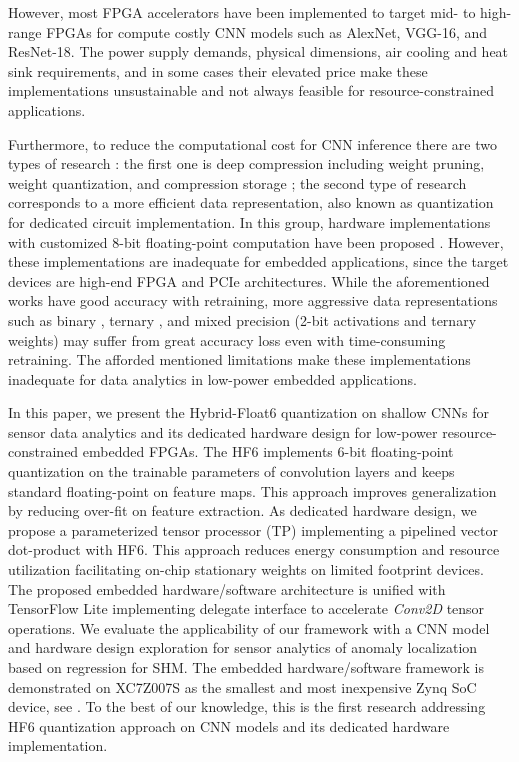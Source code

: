 However, most FPGA accelerators have been implemented to target mid- to high-range FPGAs for compute costly CNN models such as AlexNet, VGG-16, and ResNet-18. The power supply demands, physical dimensions, air cooling and heat sink requirements, and in some cases their elevated price make these implementations unsustainable and not always feasible for resource-constrained applications.

Furthermore, to reduce the computational cost for CNN inference there are two types of research \cite{wu2021low}: the first one is deep compression including weight pruning, weight quantization, and compression storage \cite{han2015deep,han2015learning}; the second type of research corresponds to a more efficient data representation, also known as quantization for dedicated circuit implementation. In this group, hardware implementations with customized 8-bit floating-point computation have been proposed \cite{mei2017200mhz, wu2021low, lian2019high}. However, these implementations are inadequate for embedded applications, since the target devices are high-end FPGA and PCIe architectures. While the aforementioned works have good accuracy with retraining, more aggressive data representations such as binary \cite{courbariaux2015binaryconnect}, ternary \cite{lin2015neural}, and mixed precision (2-bit activations and ternary weights) \cite{colangelo2018exploration} may suffer from great accuracy loss even with time-consuming retraining. The afforded mentioned limitations make these implementations inadequate for data analytics in low-power embedded applications.

In this paper, we present the Hybrid-Float6 quantization on shallow CNNs for sensor data analytics and its dedicated hardware design for low-power resource-constrained embedded FPGAs. The HF6 implements 6-bit floating-point quantization on the trainable parameters of convolution layers and keeps standard floating-point on feature maps. This approach improves generalization by reducing over-fit on feature extraction. As dedicated hardware design, we propose a parameterized tensor processor (TP) implementing a pipelined vector dot-product with HF6. This approach reduces energy consumption and resource utilization facilitating on-chip stationary weights on limited footprint devices. The proposed embedded hardware/software architecture is unified with TensorFlow Lite implementing delegate interface to accelerate \emph{Conv2D} tensor operations. We evaluate the applicability of our framework with a CNN model and hardware design exploration for sensor analytics of anomaly localization based on regression for SHM. The embedded hardware/software framework is demonstrated on XC7Z007S as the smallest and most inexpensive Zynq SoC device, see . To the best of our knowledge, this is the first research addressing HF6 quantization approach on CNN models and its dedicated hardware implementation.

